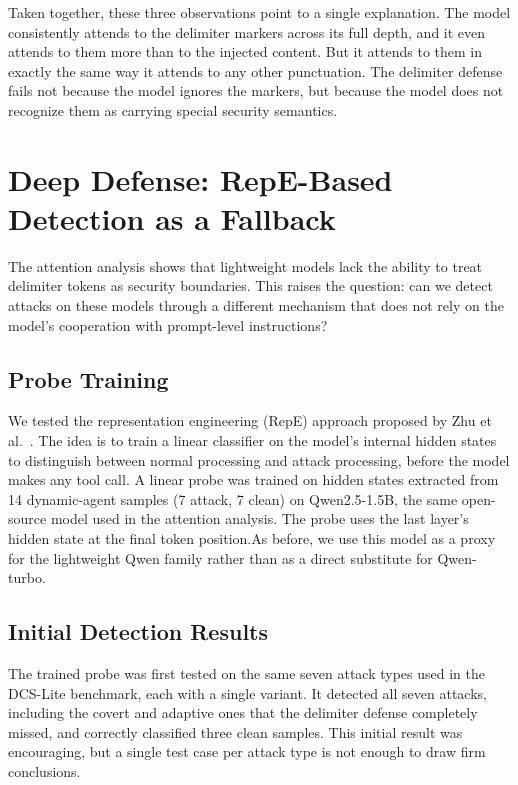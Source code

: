 \documentclass[journal]{IEEEtran}
\begin{document}
Taken together, these three observations point to a single explanation. The model consistently attends to the delimiter markers across its full depth, and it even attends to them more than to the injected content. But it attends to them in exactly the same way it attends to any other punctuation. The delimiter defense fails not because the model ignores the markers, but because the model does not recognize them as carrying special security semantics.

\section{Deep Defense: RepE-Based Detection as a Fallback}

The attention analysis shows that lightweight models lack the ability to treat delimiter tokens as security boundaries. This raises the question: can we detect attacks on these models through a different mechanism that does not rely on the model's cooperation with prompt-level instructions?

\subsection{Probe Training}

We tested the representation engineering (RepE) approach proposed by Zhu et al.~\cite{zhu2026brittle}. The idea is to train a linear classifier on the model's internal hidden states to distinguish between normal processing and attack processing, before the model makes any tool call. A linear probe was trained on hidden states extracted from 14 dynamic-agent samples (7 attack, 7 clean) on Qwen2.5-1.5B, the same open-source model used in the attention analysis. The probe uses the last layer's hidden state at the final token position.As before, we use this model as a proxy for the lightweight Qwen family rather than as a direct substitute for Qwen-turbo.

\subsection{Initial Detection Results}

The trained probe was first tested on the same seven attack types used in the DCS-Lite benchmark, each with a single variant. It detected all seven attacks, including the covert and adaptive ones that the delimiter defense completely missed, and correctly classified three clean samples. This initial result was encouraging, but a single test case per attack type is not enough to draw firm conclusions.
\end{document}
